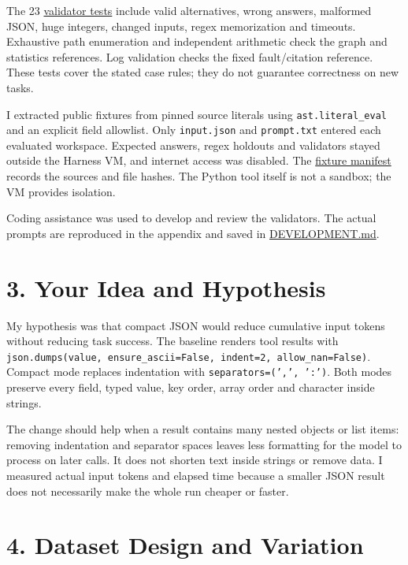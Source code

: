 \documentclass[10pt,letterpaper]{article}
\begin{document}
The 23 \href{https://github.com/a-little-hoof/580-final/blob/main/study/controlled/tests/test\_validators.py}{validator tests} include valid alternatives, wrong answers, malformed JSON, huge integers, changed inputs, regex memorization and timeouts. Exhaustive path enumeration and independent arithmetic check the graph and statistics references. Log validation checks the fixed fault/citation reference. These tests cover the stated case rules; they do not guarantee correctness on new tasks.

I extracted public fixtures from pinned source literals using \texttt{ast.literal\_eval} and an explicit field allowlist. Only \texttt{input.json} and \texttt{prompt.txt} entered each evaluated workspace. Expected answers, regex holdouts and validators stayed outside the Harness VM, and internet access was disabled. The \href{https://github.com/a-little-hoof/580-final/blob/main/study/controlled/fixtures/manifest.json}{fixture manifest} records the sources and file hashes. The Python tool itself is not a sandbox; the VM provides isolation.

Coding assistance was used to develop and review the validators. The actual prompts are reproduced in the appendix and saved in \href{https://github.com/a-little-hoof/580-final/blob/main/study/controlled/validators/DEVELOPMENT.md}{DEVELOPMENT.md}.

\section*{3. Your Idea and Hypothesis}

My hypothesis was that compact JSON would reduce cumulative input tokens without reducing task success. The baseline renders tool results with \texttt{json.dumps(value, ensure\_ascii=False, indent=2, allow\_nan=False)}. Compact mode replaces indentation with \texttt{separators=(',', ':')}. Both modes preserve every field, typed value, key order, array order and character inside strings.

The change should help when a result contains many nested objects or list items: removing indentation and separator spaces leaves less formatting for the model to process on later calls. It does not shorten text inside strings or remove data. I measured actual input tokens and elapsed time because a smaller JSON result does not necessarily make the whole run cheaper or faster.

\section*{4. Dataset Design and Variation}
\end{document}
